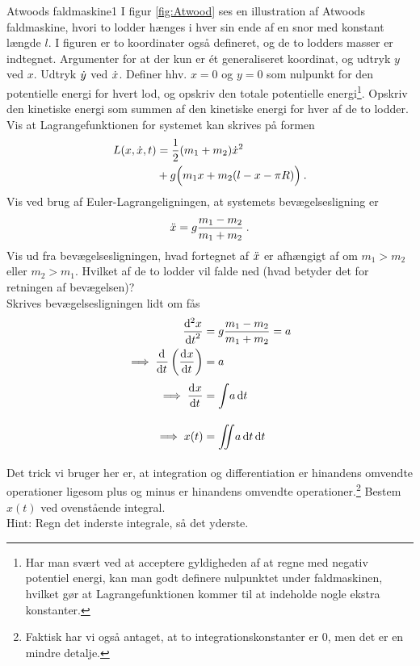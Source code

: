 \begin{opgave}{Atwoods faldmaskine}{1} \label{opg:Atwood}
I figur \ref{fig:Atwood} ses en illustration af Atwoods faldmaskine, hvori to lodder hænges i hver sin ende af en snor med konstant længde $l$. I figuren er to koordinater også defineret, og de to lodders masser er indtegnet.
\opg Argumenter for at der kun er ét generaliseret koordinat, og udtryk $y$ ved $x$.
\opg Udtryk $\dt{y}$ ved $\dt{x}$.
\opg Definer hhv. $x = 0$ og $y = 0$ som nulpunkt for den potentielle energi for hvert lod, og opskriv den totale potentielle energi\footnote{Har man svært ved at acceptere gyldigheden af at regne med negativ potentiel energi, kan man godt definere nulpunktet under faldmaskinen, hvilket gør at Lagrangefunktionen kommer til at indeholde nogle ekstra konstanter.}.
\opg Opskriv den kinetiske energi som summen af den kinetiske energi for hver af de to lodder.
\opg Vis at Lagrangefunktionen for systemet kan skrives på formen
\begin{align*}
	L(x,\dt{x},t) &= \frac{1}{2}(m_1+m_2)\dt{x}^2 \\
	&+ g\Big(m_1x + m_2(l-x-\pi R)\Big) \: .
\end{align*}
\opg Vis ved brug af Euler-Lagrangeligningen, at systemets bevægelsesligning er
\begin{align*}
	\ddt{x} = g\frac{m_1-m_2}{m_1+m_2} \: .
\end{align*}
\opg Vis ud fra bevægelsesligningen, hvad fortegnet af $\ddt{x}$ er afhængigt af om $m_1>m_2$ eller $m_2>m_1$. Hvilket af de to lodder vil falde ned (hvad betyder det for retningen af bevægelsen)?\\ 
Skrives bevægelsesligningen lidt om fås
\begin{align*}
	\dif[2]{t}{x} &= g\frac{m_1-m_2}{m_1+m_2} = a \\
	\implies \dif{t}{} \left( \dif{t}{x} \right) &= a \\
	\implies \dif{t}{x} &= \ubint{a}{t}\\
	\implies x(t) &= \ubiint{a}{t}{t}
\end{align*}
Det trick vi bruger her er, at integration og differentiation er hinandens omvendte operationer ligesom plus og minus er hinandens omvendte operationer.\footnote{Faktisk har vi også antaget, at to integrationskonstanter er $0$, men det er en mindre detalje.} 
\opg Bestem $x(t)$ ved ovenstående integral.\\ 
Hint: Regn det inderste integrale, så det yderste.
\end{opgave}
%
%
